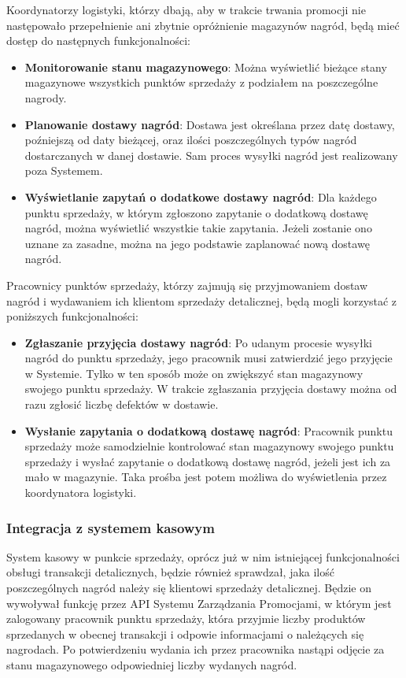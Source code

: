 \documentclass[a4paper,12pt]{article}
\begin{document}
Koordynatorzy logistyki, którzy dbają, aby w trakcie trwania promocji nie następowało przepełnienie ani zbytnie opróżnienie magazynów nagród, będą mieć dostęp do następnych funkcjonalności:
\begin{itemize}
    \item \textbf{Monitorowanie stanu magazynowego}:
    Można wyświetlić bieżące stany magazynowe wszystkich punktów sprzedaży z podziałem na poszczególne nagrody.
    \item \textbf{Planowanie dostawy nagród}:
    Dostawa jest określana przez datę dostawy, poźniejszą od daty bieżącej, oraz ilości poszczególnych typów nagród dostarczanych w danej dostawie.
    Sam proces wysyłki nagród jest realizowany poza Systemem.
    \item \textbf{Wyświetlanie zapytań o dodatkowe dostawy nagród}:
    Dla każdego punktu sprzedaży, w którym zgłoszono zapytanie o dodatkową dostawę nagród, można wyświetlić wszystkie takie zapytania.
    Jeżeli zostanie ono uznane za zasadne, można na jego podstawie zaplanować nową dostawę nagród.
\end{itemize}

Pracownicy punktów sprzedaży, którzy zajmują się przyjmowaniem dostaw nagród i wydawaniem ich klientom sprzedaży detalicznej, będą mogli korzystać z poniższych funkcjonalności:
\begin{itemize}
    \item \textbf{Zgłaszanie przyjęcia dostawy nagród}:
    Po udanym procesie wysyłki nagród do punktu sprzedaży, jego pracownik musi zatwierdzić jego przyjęcie w Systemie.
    Tylko w ten sposób może on zwiększyć stan magazynowy swojego punktu sprzedaży.
    W trakcie zgłaszania przyjęcia dostawy można od razu zgłosić liczbę defektów w dostawie.
    \item \textbf{Wysłanie zapytania o dodatkową dostawę nagród}:
    Pracownik punktu sprzedaży może samodzielnie kontrolować stan magazynowy swojego punktu sprzedaży i wysłać zapytanie o dodatkową dostawę nagród, jeżeli jest ich za mało w magazynie.
    Taka prośba jest potem możliwa do wyświetlenia przez koordynatora logistyki.
\end{itemize}

\subsubsection{Integracja z systemem kasowym}

System kasowy w punkcie sprzedaży, oprócz już w nim istniejącej funkcjonalności obsługi transakcji detalicznych, będzie również sprawdzał, jaka ilość poszczególnych nagród należy się klientowi sprzedaży detalicznej.
Będzie on wywoływał funkcję przez API Systemu Zarządzania Promocjami, w którym jest zalogowany pracownik punktu sprzedaży, która przyjmie liczby produktów sprzedanych w obecnej transakcji i odpowie informacjami o należących się nagrodach.
Po potwierdzeniu wydania ich przez pracownika nastąpi odjęcie za stanu magazynowego odpowiedniej liczby wydanych nagród.
\end{document}
